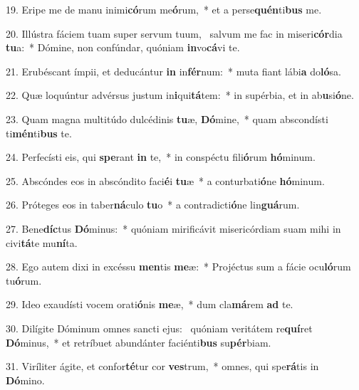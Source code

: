 19. Eripe me de manu inimi\textbf{có}rum me\textbf{ó}rum,~*  et a perse\textbf{quén}ti\textbf{bus} me.\

20. Illústra fáciem tuam super servum tuum, \dag\  salvum me fac in miseri\textbf{cór}dia \textbf{tu}a:~*  Dómine, non confúndar, quóniam \textbf{in}vo\textbf{cá}vi te.\

21. Erubéscant ímpii, et deducántur \textbf{in} in\textbf{fér}num:~*  muta fiant lábi\textbf{a} do\textbf{ló}sa.\

22. Quæ loquúntur advérsus justum in\textbf{i}qui\textbf{tá}tem:~*  in supérbia, et in ab\textbf{u}si\textbf{ó}ne.\

23. Quam magna multitúdo dulcédinis \textbf{tu}æ, \textbf{Dó}mine,~*  quam abscondísti ti\textbf{mén}ti\textbf{bus} te.\

24. Perfecísti eis, qui \textbf{spe}rant \textbf{in} te,~*  in conspéctu fili\textbf{ó}rum \textbf{hó}minum.\

25. Abscóndes eos in abscóndito faci\textbf{é}i \textbf{tu}æ~*  a conturbati\textbf{ó}ne \textbf{hó}minum.\

26. Próteges eos in taber\textbf{ná}culo \textbf{tu}o~*  a contradicti\textbf{ó}ne lin\textbf{guá}rum.\

27. Bene\textbf{díc}tus \textbf{Dó}minus:~*  quóniam mirificávit misericórdiam suam mihi in civi\textbf{tá}te mu\textbf{ní}ta.\

28. Ego autem dixi in excéssu \textbf{men}tis \textbf{me}æ:~*  Projéctus sum a fácie ocu\textbf{ló}rum tu\textbf{ó}rum.\

29. Ideo exaudísti vocem orati\textbf{ó}nis \textbf{me}æ,~*  dum cla\textbf{má}rem \textbf{ad} te.\

30. Dilígite Dóminum omnes sancti ejus: \dag\  quóniam veritátem re\textbf{quí}ret \textbf{Dó}minus,~*  et retríbuet abundánter faciénti\textbf{bus} su\textbf{pér}biam.\

31. Viríliter ágite, et confor\textbf{té}tur cor \textbf{ves}trum,~*  omnes, qui spe\textbf{rá}tis in \textbf{Dó}mino.\

